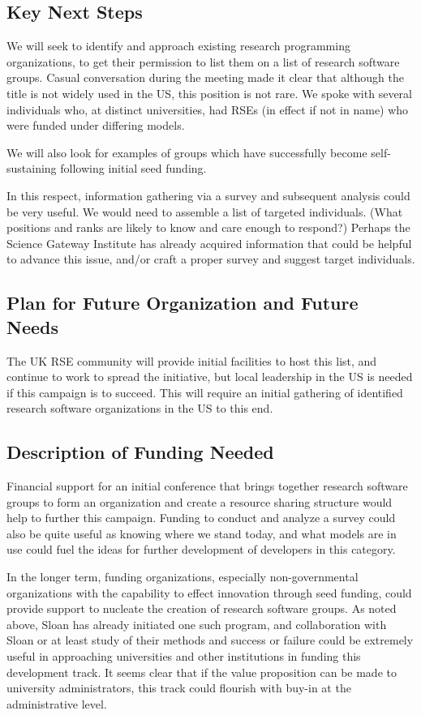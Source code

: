 \subsection{Key Next Steps}

We will seek to identify and approach existing research programming organizations,
to get their permission to list them on a list of research software groups.
Casual conversation during the meeting made it clear that although the title is
not widely used in the US, this position is not rare. We spoke with several
individuals who, at distinct universities, had RSEs (in effect if not in name)
who were funded under differing models.

We will also look for examples of groups which have successfully become self-
sustaining following initial seed funding.

In this respect, information gathering via a survey and subsequent analysis could be
very useful. We would need to assemble a list of targeted individuals. (What
positions and ranks are likely to know and care enough to respond?) Perhaps the
Science Gateway Institute has already acquired information that could be helpful
to advance this issue, and/or craft a proper survey and suggest target individuals.

\subsection{Plan for Future Organization and Future Needs}

The UK RSE community will provide initial facilities to host this list, and
continue to work to spread the initiative, but local leadership in the US is
needed if this campaign is to succeed. This will require an initial gathering of
identified research software organizations in the US to this end.

\subsection{Description of Funding Needed}

Financial support for an initial conference that brings together research software
groups to form an organization and create a resource sharing structure would
help to further this campaign. Funding to conduct and analyze a survey could
also be quite useful as knowing where we stand today, and what models are in use
could fuel the ideas for further development of developers in this category.

In the longer term, funding organizations, especially non-governmental
organizations with the capability to effect innovation through seed funding,
could provide support to nucleate the creation of research software groups. As
noted above, Sloan has already initiated one such program, and collaboration
with Sloan or at least study of their methods and success or failure could be
extremely useful in approaching universities and other institutions in funding
this development track. It seems clear that if the value proposition can be made
to university administrators, this track could flourish with buy-in at the
administrative level.

